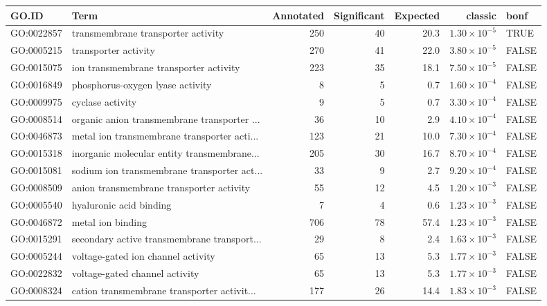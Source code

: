 \begin{table}[ht]
\centering
\begin{adjustbox}{width=\textwidth}
\begin{tabular}{llrrrrl}
  \hline
GO.ID & Term & Annotated & Significant & Expected & classic & bonf \\ 
  \hline
GO:0022857 & transmembrane transporter activity & 250 & 40 & 20.3 & $1.30 \times 10^{-5}$ & TRUE \\ 
  GO:0005215 & transporter activity & 270 & 41 & 22.0 & $3.80 \times 10^{-5}$ & FALSE \\ 
  GO:0015075 & ion transmembrane transporter activity & 223 & 35 & 18.1 & $7.50 \times 10^{-5}$ & FALSE \\ 
  GO:0016849 & phosphorus-oxygen lyase activity & 8 & 5 & 0.7 & $1.60 \times 10^{-4}$ & FALSE \\ 
  GO:0009975 & cyclase activity & 9 & 5 & 0.7 & $3.30 \times 10^{-4}$ & FALSE \\ 
  GO:0008514 & organic anion transmembrane transporter ... & 36 & 10 & 2.9 & $4.10 \times 10^{-4}$ & FALSE \\ 
  GO:0046873 & metal ion transmembrane transporter acti... & 123 & 21 & 10.0 & $7.30 \times 10^{-4}$ & FALSE \\ 
  GO:0015318 & inorganic molecular entity transmembrane... & 205 & 30 & 16.7 & $8.70 \times 10^{-4}$ & FALSE \\ 
  GO:0015081 & sodium ion transmembrane transporter act... & 33 & 9 & 2.7 & $9.20 \times 10^{-4}$ & FALSE \\ 
  GO:0008509 & anion transmembrane transporter activity & 55 & 12 & 4.5 & $1.20 \times 10^{-3}$ & FALSE \\ 
  GO:0005540 & hyaluronic acid binding & 7 & 4 & 0.6 & $1.23 \times 10^{-3}$ & FALSE \\ 
  GO:0046872 & metal ion binding & 706 & 78 & 57.4 & $1.23 \times 10^{-3}$ & FALSE \\ 
  GO:0015291 & secondary active transmembrane transport... & 29 & 8 & 2.4 & $1.63 \times 10^{-3}$ & FALSE \\ 
  GO:0005244 & voltage-gated ion channel activity & 65 & 13 & 5.3 & $1.77 \times 10^{-3}$ & FALSE \\ 
  GO:0022832 & voltage-gated channel activity & 65 & 13 & 5.3 & $1.77 \times 10^{-3}$ & FALSE \\ 
  GO:0008324 & cation transmembrane transporter activit... & 177 & 26 & 14.4 & $1.83 \times 10^{-3}$ & FALSE \\ 

\end{tabular}
\end{adjustbox}
\end{table}
